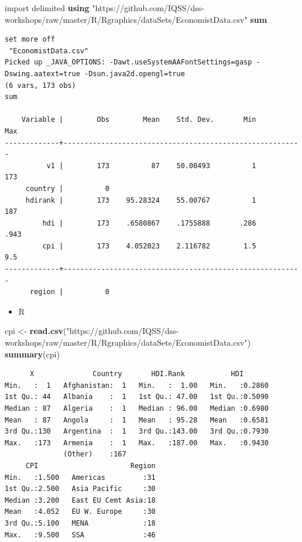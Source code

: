 \documentclass[]{book}
\newenvironment{Shaded}{\begin{snugshade}}{\end{snugshade}}
\newcommand{\KeywordTok}[1]{\textcolor[rgb]{0.13,0.29,0.53}{\textbf{#1}}}
\newcommand{\NormalTok}[1]{#1}
\newcommand{\StringTok}[1]{\textcolor[rgb]{0.31,0.60,0.02}{#1}}
\providecommand{\tightlist}{%
  \setlength{\itemsep}{0pt}\setlength{\parskip}{0pt}}
\begin{document}
\begin{Shaded}
\begin{Highlighting}[]
\NormalTok{import delimited }\KeywordTok{using} \StringTok{"https://github.com/IQSS/dss-workshops/raw/master/R/Rgraphics/dataSets/EconomistData.csv"}
\KeywordTok{sum}
\end{Highlighting}
\end{Shaded}

\begin{verbatim}
set more off
 "EconomistData.csv"
Picked up _JAVA_OPTIONS: -Dawt.useSystemAAFontSettings=gasp -Dswing.aatext=true -Dsun.java2d.opengl=true
(6 vars, 173 obs)
sum

    Variable |        Obs        Mean    Std. Dev.       Min        Max
-------------+---------------------------------------------------------
          v1 |        173          87    50.08493          1        173
     country |          0
     hdirank |        173    95.28324    55.00767          1        187
         hdi |        173    .6580867    .1755888       .286       .943
         cpi |        173    4.052023    2.116782        1.5        9.5
-------------+---------------------------------------------------------
      region |          0
\end{verbatim}

\begin{itemize}
\tightlist
\item
  R
\end{itemize}

\begin{Shaded}
\begin{Highlighting}[]
\NormalTok{cpi <-}\StringTok{ }\KeywordTok{read.csv}\NormalTok{(}\StringTok{"https://github.com/IQSS/dss-workshops/raw/master/R/Rgraphics/dataSets/EconomistData.csv"}\NormalTok{)}
\KeywordTok{summary}\NormalTok{(cpi)}
\end{Highlighting}
\end{Shaded}

\begin{verbatim}
      X              Country       HDI.Rank           HDI        
Min.   :  1   Afghanistan:  1   Min.   :  1.00   Min.   :0.2860  
1st Qu.: 44   Albania    :  1   1st Qu.: 47.00   1st Qu.:0.5090  
Median : 87   Algeria    :  1   Median : 96.00   Median :0.6980  
Mean   : 87   Angola     :  1   Mean   : 95.28   Mean   :0.6581  
3rd Qu.:130   Argentina  :  1   3rd Qu.:143.00   3rd Qu.:0.7930  
Max.   :173   Armenia    :  1   Max.   :187.00   Max.   :0.9430  
              (Other)    :167                                    
     CPI                      Region  
Min.   :1.500   Americas         :31  
1st Qu.:2.500   Asia Pacific     :30  
Median :3.200   East EU Cemt Asia:18  
Mean   :4.052   EU W. Europe     :30  
3rd Qu.:5.100   MENA             :18  
Max.   :9.500   SSA              :46
\end{verbatim}
\end{document}
